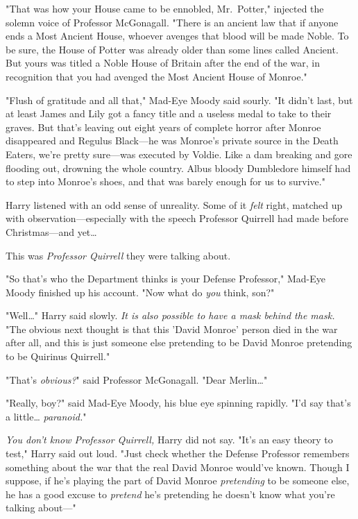 "That was how your House came to be ennobled, Mr.~Potter," injected the solemn 
voice of Professor McGonagall. "There is an ancient law that if anyone ends a 
Most Ancient House, whoever avenges that blood will be made Noble. To be sure, 
the House of Potter was already older than some lines called Ancient. But yours 
was titled a Noble House of Britain after the end of the war, in recognition 
that you had avenged the Most Ancient House of Monroe."

"Flush of gratitude and all that," Mad-Eye Moody said sourly. "It didn't last, 
but at least James and Lily got a fancy title and a useless medal to take to 
their graves. But that's leaving out eight years of complete horror after 
Monroe disappeared and Regulus Black---he was Monroe's private source in the 
Death Eaters, we're pretty sure---was executed by Voldie. Like a dam breaking 
and gore flooding out, drowning the whole country. Albus bloody Dumbledore 
himself had to step into Monroe's shoes, and that was barely enough for us to 
survive."

Harry listened with an odd sense of unreality. Some of it \emph{felt} right, 
matched up with observation---especially with the speech Professor Quirrell had 
made before Christmas---and yet{\ldots}

This was \emph{Professor Quirrell} they were talking about.

"So that's who the Department thinks is your Defense Professor," Mad-Eye Moody 
finished up his account. "Now what do \emph{you} think, son?"

"Well{\ldots}" Harry said slowly. \emph{It is also possible to have a mask 
behind the mask.} "The obvious next thought is that this 'David Monroe' person 
died in the war after all, and this is just someone else pretending to be David 
Monroe pretending to be Quirinus Quirrell."

"That's \emph{obvious?}" said Professor McGonagall. "Dear Merlin{\ldots}"

"Really, boy?" said Mad-Eye Moody, his blue eye spinning rapidly. "I'd say 
that's a little{\ldots} \emph{paranoid.}"

\emph{You don't know Professor Quirrell,} Harry did not say. "It's an easy 
theory to test," Harry said out loud. "Just check whether the Defense Professor 
remembers something about the war that the real David Monroe would've known. 
Though I suppose, if he's playing the part of David Monroe \emph{pretending} to 
be someone else, he has a good excuse to \emph{pretend} he's pretending he 
doesn't know what you're talking about---"


